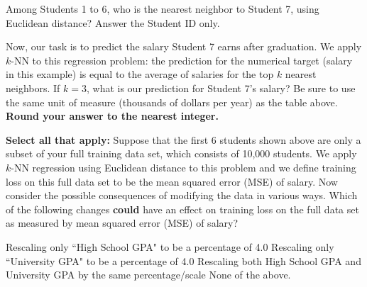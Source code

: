 \documentclass[11pt,addpoints,answers]{exam}
\newcommand{\sall}{\textbf{Select all that apply: }}
\begin{document}
\begin{questions}
\begin{parts}
    \begin{subparts}
    \subpart[2] Among Students 1 to 6, who is the nearest neighbor to Student 7, using Euclidean distance? Answer the Student ID only.
    
    \begin{your_solution}[title=Your answer:,height=2cm,width=5cm]
    \end{your_solution}
    
    
    
    \subpart[2] Now, our task is to predict the salary Student 7 earns after graduation. We apply $k$-NN to this regression problem: the prediction for the numerical target (salary in this example) is equal to the average of salaries for the top $k$ nearest neighbors. If $k=3$, what is our prediction for Student 7's salary? Be sure to use the same unit of measure (thousands of dollars per year) as the table above. \\
    \textbf{Round your answer to the nearest integer.}
    
    \begin{your_solution}[title=Your answer:,height=2cm,width=5cm]
    \end{your_solution}
    
    

    \subpart[2] \sall Suppose that the first 6 students shown above are only a subset of your full training data set, which consists of 10,000 students. We apply $k$-NN regression using Euclidean distance to this problem and we define training loss on this full data set to be the mean squared error (MSE) of salary. Now consider the possible consequences of modifying the data in various ways. Which of the following changes \textbf{could} have an effect on training loss on the full data set as measured by mean squared error (MSE) of salary?
    
    
        
    
    {
    \checkboxchar{$\Box$} \checkedchar{$\blacksquare$}
    \begin{checkboxes}
        \choice Rescaling only ``High School GPA" to be a percentage of 4.0
        \choice Rescaling only ``University GPA" to be a percentage of 4.0
        \choice Rescaling both High School GPA and University GPA by the same percentage/scale
        \choice None of the above.
    \end{checkboxes}
    }

    
    
    \end{subparts}


\end{parts}
\end{questions}
\end{document}
